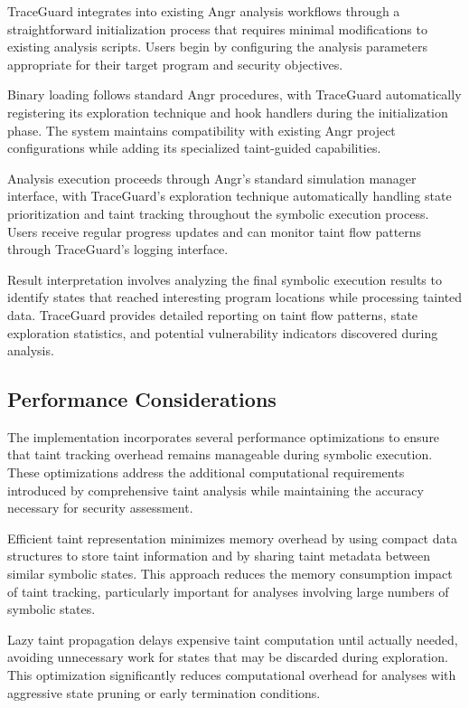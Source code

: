 TraceGuard integrates into existing Angr analysis workflows through a straightforward initialization process that requires minimal modifications to existing analysis scripts. Users begin by configuring the analysis parameters appropriate for their target program and security objectives.

Binary loading follows standard Angr procedures, with TraceGuard automatically registering its exploration technique and hook handlers during the initialization phase. The system maintains compatibility with existing Angr project configurations while adding its specialized taint-guided capabilities.

Analysis execution proceeds through Angr's standard simulation manager interface, with TraceGuard's exploration technique automatically handling state prioritization and taint tracking throughout the symbolic execution process. Users receive regular progress updates and can monitor taint flow patterns through TraceGuard's logging interface.

Result interpretation involves analyzing the final symbolic execution results to identify states that reached interesting program locations while processing tainted data. TraceGuard provides detailed reporting on taint flow patterns, state exploration statistics, and potential vulnerability indicators discovered during analysis.

\subsection{Performance Considerations}

The implementation incorporates several performance optimizations to ensure that taint tracking overhead remains manageable during symbolic execution. These optimizations address the additional computational requirements introduced by comprehensive taint analysis while maintaining the accuracy necessary for security assessment.

Efficient taint representation minimizes memory overhead by using compact data structures to store taint information and by sharing taint metadata between similar symbolic states. This approach reduces the memory consumption impact of taint tracking, particularly important for analyses involving large numbers of symbolic states.

Lazy taint propagation delays expensive taint computation until actually needed, avoiding unnecessary work for states that may be discarded during exploration. This optimization significantly reduces computational overhead for analyses with aggressive state pruning or early termination conditions.

